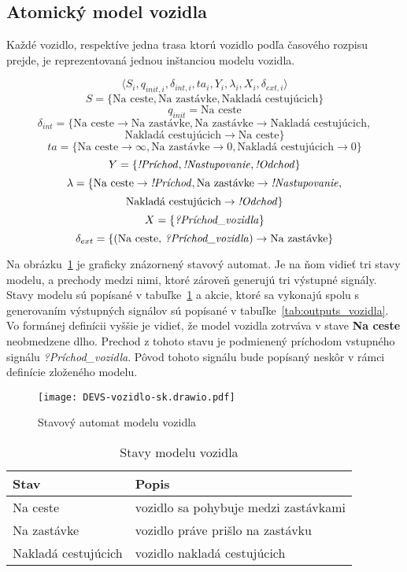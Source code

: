 \newpage
\subsection*{Atomický model vozidla}\label{model_vozidla}

Každé vozidlo, respektíve jedna trasa ktorú vozidlo podľa časového rozpisu prejde, je reprezentovaná jednou inštanciou modelu vozidla.

\[\langle S_i, q_{init,i}, {\delta}_{int,i}, ta_i, Y_i, {\lambda}_i, X_i, {\delta}_{ext,i} \rangle\]
\[S = \{\text{Na ceste}, \text{Na zastávke}, \text{Nakladá cestujúcich} \}\]
\[q_{init} = \text{Na ceste}\]
\[\delta_{int} = \{ \text{Na ceste} \rightarrow \text{Na zastávke}, \text{Na zastávke} \rightarrow \text{Nakladá cestujúcich},\]
\[\text{Nakladá cestujúcich} \rightarrow \text{Na ceste} \}\]
\[ta = \{ \text{Na ceste} \rightarrow \infty, \text{Na zastávke} \rightarrow 0, \text{Nakladá cestujúcich} \rightarrow 0 \}\]
\[Y = \{\text{\textit{!Príchod}}, \text{\textit{!Nastupovanie}}, \text{\textit{!Odchod}} \}\]
\[\lambda = \{ \text{Na ceste} \rightarrow \text{\textit{!Príchod}}, \text{Na zastávke} \rightarrow \text{\textit{!Nastupovanie}},\]
\[\text{Nakladá cestujúcich} \rightarrow \text{\textit{!Odchod}} \}\]
\[X = \{ \text{\textit{?Príchod\_vozidla}} \}\]
\[\delta_{ext} = \{ (\text{Na ceste, \textit{?Príchod\_vozidla}}) \rightarrow \text{Na zastávke} \}\]

Na obrázku~\ref{fig:model_vozidla} je graficky znázornený stavový automat.
Je na ňom vidieť tri stavy modelu, a prechody medzi nimi, ktoré zároveň generujú tri výstupné signály.
Stavy modelu sú popísané v tabuľke~\ref{tab:stavy_vozidla} a akcie, ktoré sa vykonajú spolu s generovaním výstupných signálov sú popísané v tabuľke~\ref{tab:outputs_vozidla}.
Vo formánej definícii vyššie je vidieť, že model vozidla zotrváva v stave \textbf{Na ceste} neobmedzene dlho.
Prechod z tohoto stavu je podmienený príchodom vstupného signálu \textit{?Príchod\_vozidla}.
Pôvod tohoto signálu bude popísaný neskôr v rámci definície zloženého modelu.

\begin{figure}[h]\label{fig:model_vozidla}
  \centering
  \texttt{[image: DEVS-vozidlo-sk.drawio.pdf]}
  \caption{Stavový automat modelu vozidla}
\end{figure}

\begin{table}[h]\label{tab:stavy_vozidla}
  \centering
  \begin{tabularx}{\textwidth}{|l|X|}
    \hline
    \textbf{Stav} & \textbf{Popis} \\ \hline
    Na ceste & vozidlo sa pohybuje medzi zastávkami \\ \hline
    Na zastávke & vozidlo práve prišlo na zastávku \\ \hline
    Nakladá cestujúcich & vozidlo nakladá cestujúcich \\ \hline
  \end{tabularx}
  \caption{Stavy modelu vozidla}
\end{table}


